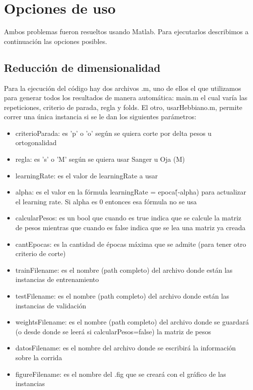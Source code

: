 \documentclass[informe.tex]{subfiles}
\begin{document}
  
  \section{Opciones de uso}

    Ambos problemas fueron resueltos usando Matlab. Para ejecutarlos describimos a continuación las opciones posibles.
  
    \subsection{Reducción de dimensionalidad}
      Para la ejecución del código hay dos archivos .m, uno de ellos el que utilizamos para generar todos los resultados de manera autom\'atica: main.m el cual varía las repeticiones, criterio de parada, regla y folds. El otro, usarHebbiano.m, permite correr una única instancia si se le dan los siguientes par\'ametros:
      
      \begin{itemize}
	\item criterioParada: es 'p' o 'o' seg\'un se quiera corte por delta pesos u ortogonalidad
	\item regla: es 's' o 'M' seg\'un se quiera usar Sanger u Oja (M)
	\item learningRate: es el valor de learningRate a usar
	\item alpha: es el valor en la f\'ormula learningRate = epoca\^(-alpha) para actualizar el learning rate. Si alpha es 0 entonces esa f\'ormula no se usa
	\item calcularPesos: es un bool que cuando es true indica que se calcule la matriz de pesos mientras que cuando es false indica que se lea una matriz ya creada
	\item cantEpocas: es la cantidad de \'epocas m\'axima que se admite (para tener otro criterio de corte)
	\item trainFilename: es el nombre (path completo) del archivo donde est\'an las instancias de entrenamiento
	\item testFilename: es el nombre (path completo) del archivo donde est\'an las instancias de validaci\'on
	\item weightsFilename: es el nombre (path completo) del archivo donde se guardar\'a (o desde donde se leer\'a si calcularPesos=false) la matriz de pesos
	\item datosFilename: es el nombre del archivo donde se escribir\'a la informaci\'on sobre la corrida
	\item figureFilename: es el nombre del .fig que se crear\'a con el gr\'afico de las instancias
      \end{itemize}
     
\end{document}
